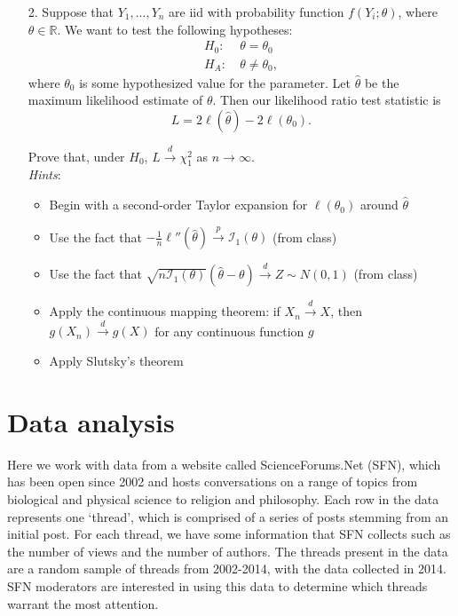 \documentclass[11pt]{article}
\begin{document}
\begin{enumerate}
\item[2.] Suppose that $Y_1,...,Y_n$ are iid with probability function $f(Y_i; \theta)$, where $\theta \in \mathbb{R}$. We want to test the following hypotheses:
\begin{align*}
H_0: \ &\theta = \theta_0 \\
H_A: \ &\theta \neq \theta_0,
\end{align*}
where $\theta_0$ is some hypothesized value for the parameter. Let $\widehat{\theta}$ be the maximum likelihood estimate of $\theta$. Then our likelihood ratio test statistic is
$$L = 2 \ell(\widehat{\theta}) - 2 \ell(\theta_0).$$

Prove that, under $H_0$, $L \overset{d}{\to} \chi^2_1$ as $n \to \infty$.\\

\textit{Hints}:
\begin{itemize}
\item Begin with a second-order Taylor expansion for $\ell(\theta_0)$ around $\widehat{\theta}$
\item Use the fact that $-\frac{1}{n} \ell''(\widehat{\theta}) \overset{p}{\to} \mathcal{I}_1(\theta)$ (from class)
\item Use the fact that $\sqrt{n \mathcal{I}_1(\theta)}(\widehat{\theta} - \theta) \overset{d}{\to} Z \sim N(0, 1)$ (from class)
\item Apply the continuous mapping theorem: if $X_n \overset{d}{\to} X$, then $g(X_n) \overset{d}{\to} g(X)$ for any continuous function $g$
\item Apply Slutsky's theorem
\end{itemize}
\end{enumerate}


\section*{Data analysis}

Here we work with data from a website called ScienceForums.Net (SFN), which has been open since 2002 and hosts conversations on a range of topics from biological and physical science to religion and philosophy. Each row in the data represents one ‘thread’, which is comprised of a series of posts stemming from an initial post. For each thread, we have some information that SFN collects such as the number of views and the number of authors. The threads present in the data are a random sample of threads from 2002-2014, with the data collected in 2014. SFN moderators are interested in using this data to determine which threads warrant the most attention.\\
\end{document}
